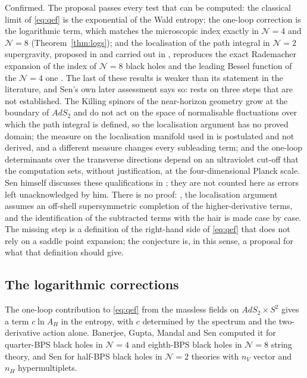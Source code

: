 \begin{verdict}[claim 27]
Confirmed. The proposal passes every test that can be computed: the classical limit of \eqref{eq:qef} is the exponential of the Wald entropy; the one-loop correction is the logarithmic term, which matches the microscopic index exactly in $\mathcal N=4$ and $\mathcal N=8$ (Theorem~\ref{thm:logs}); and the localisation of the path integral in $\mathcal N=2$ supergravity, proposed in \cite{BBGMS10} and carried out in \cite{DGM11,DGM13}, reproduces the exact Rademacher expansion of the index of $\mathcal N=8$ black holes and the leading Bessel function of the $\mathcal N=4$ one \cite{MurthyReys16,IMT25,IMT25b}. The last of these results is weaker than its statement in the literature, and Sen's own later assessment \cite{Sen23localisation} says so:  rests on three steps that are not established. The Killing spinors of the near-horizon geometry grow at the boundary of $AdS_2$ and do not act on the space of normalisable fluctuations over which the path integral is defined, so the localisation argument has no proved domain; the measure on the localisation manifold used in \cite{DGM11,MurthyReys16} is postulated and not derived, and a different measure changes every subleading term; and the one-loop determinants over the transverse directions depend on an ultraviolet cut-off that the computation sets, without justification, at the four-dimensional Planck scale. Sen himself discusses these qualifications in \cite{Sen23localisation}; they are not counted here as errors left unacknowledged by him. There is no proof: , the localisation argument assumes an off-shell supersymmetric completion of the higher-derivative terms, and the identification of the subtracted terms with the hair is made case by case. The missing step is a definition of the right-hand side of \eqref{eq:qef} that does not rely on a saddle point expansion; the conjecture is, in this sense, a proposal for what that definition should give.
\end{verdict}

\subsection{The logarithmic corrections}\label{ssec:logs}

The one-loop contribution to \eqref{eq:qef} from the massless fields on $AdS_2\times S^2$ gives a term $c\ln A_H$ in the entropy, with $c$ determined by the spectrum and the two-derivative action alone. Banerjee, Gupta, Mandal and Sen \cite{BGMS11} computed it for quarter-BPS black holes in $\mathcal N=4$ and eighth-BPS black holes in $\mathcal N=8$ string theory, and Sen \cite{Sen12N2} for half-BPS black holes in $\mathcal N=2$ theories with $n_V$ vector and $n_H$ hypermultiplets.

